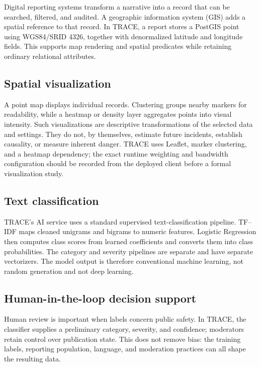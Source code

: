 \documentclass[11pt]{article}
\begin{document}
Digital reporting systems transform a narrative into a record that can be
searched, filtered, and audited. A geographic information system (GIS)
adds a spatial reference to that record. In TRACE, a report stores a
PostGIS point using WGS84/SRID 4326, together with denormalized latitude and
longitude fields. This supports map rendering and spatial predicates while
retaining ordinary relational attributes.

\subsection{Spatial visualization}

A point map displays individual records. Clustering groups nearby markers for
readability, while a heatmap or density layer aggregates points into visual
intensity. Such visualizations are descriptive transformations of the
selected data and settings. They do not, by themselves, estimate future
incidents, establish causality, or measure inherent danger. TRACE uses
Leaflet, marker clustering, and a heatmap dependency; the exact runtime
weighting and bandwidth configuration should be recorded from the deployed
client before a formal visualization study.

\subsection{Text classification}

TRACE's AI service uses a standard supervised text-classification pipeline.
TF--IDF maps cleaned unigrams and bigrams to numeric features. Logistic
Regression then computes class scores from learned coefficients and converts
them into class probabilities. The category and severity pipelines are
separate and have separate vectorizers. The model output is therefore
conventional machine learning, not random generation and not deep learning.

\subsection{Human-in-the-loop decision support}

Human review is important when labels concern public safety. In TRACE, the
classifier supplies a preliminary category, severity, and confidence;
moderators retain control over publication state. This does not remove bias:
the training labels, reporting population, language, and moderation practices
can all shape the resulting data.
\end{document}
